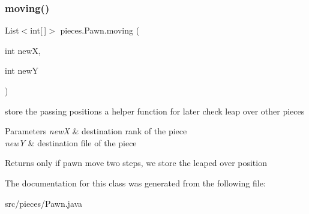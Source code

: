 \subsubsection{\texorpdfstring{moving()}{moving()}}
{\footnotesize\ttfamily List$<$int\mbox{[}$\,$\mbox{]}$>$ pieces.\+Pawn.\+moving (\begin{DoxyParamCaption}\item[{int}]{newX,  }\item[{int}]{newY }\end{DoxyParamCaption})\hspace{0.3cm}{\ttfamily [inline]}}

store the passing positions a helper function for later check leap over other pieces 
\begin{DoxyParams}{Parameters}
{\em newX} & destination rank of the piece \\
\hline
{\em newY} & destination file of the piece \\
\hline
\end{DoxyParams}
\begin{DoxyReturn}{Returns}
only if pawn move two steps, we store the leaped over position 
\end{DoxyReturn}


The documentation for this class was generated from the following file\+:\begin{DoxyCompactItemize}
\item 
src/pieces/Pawn.\+java\end{DoxyCompactItemize}
